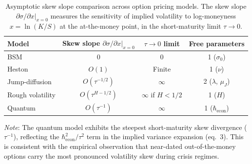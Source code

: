 \begin{table}[htbp]
\centering
\caption{Asymptotic skew slope comparison across option pricing models. The skew slope $\partial\sigma/\partial x|_{x=0}$ measures the sensitivity of implied volatility to log-moneyness $x = \ln(K/S)$ at the at-the-money point, in the short-maturity limit $\tau \to 0$.}
\label{tab:skew-asymptotics}
\begin{tabular}{lccc}
\hline
Model & Skew slope $\partial\sigma/\partial x|_{x=0}$ & $\tau\to 0$ limit & Free parameters \\
\hline
BSM & $0$ & $0$ & 1 ($\sigma_0$) \\
Heston & $O(1)$ & Finite & 1 ($\nu$) \\
Jump-diffusion & $O(\tau^{-1/2})$ & $\infty$ & 2 ($\lambda$, $\mu_J$) \\
Rough volatility & $O(\tau^{H-1/2})$ & $\infty$ if $H<1/2$ & 1 ($H$) \\
Quantum & $O(\tau^{-1})$ & $\infty$ & 1 ($\hbar_{\mathrm{econ}}$) \\
\hline
\end{tabular}

\medskip
\footnotesize
\textit{Note}: The quantum model exhibits the steepest short-maturity skew divergence ($\tau^{-1}$), reflecting the $\hbar_{\mathrm{econ}}^2/\tau^2$ term in the implied variance expansion (eq.~3). This is consistent with the empirical observation that near-dated out-of-the-money options carry the most pronounced volatility skew during crisis regimes.
\end{table}
